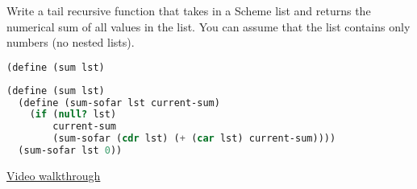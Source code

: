 \question
Write a tail recursive function that takes in a Scheme list and returns
the numerical sum of all values in the list. You can assume that the list
contains only numbers (no nested lists).
\begin{lstlisting}[language=Scheme]
(define (sum lst)
\end{lstlisting}
\begin{solution}[1.0in]
\begin{lstlisting}[language=Scheme]
(define (sum lst)
  (define (sum-sofar lst current-sum)
    (if (null? lst)
        current-sum
        (sum-sofar (cdr lst) (+ (car lst) current-sum))))
  (sum-sofar lst 0))
\end{lstlisting}
\href{https://youtu.be/9y7rnuYp-DU?t=9m27s}{Video walkthrough}
\end{solution}

